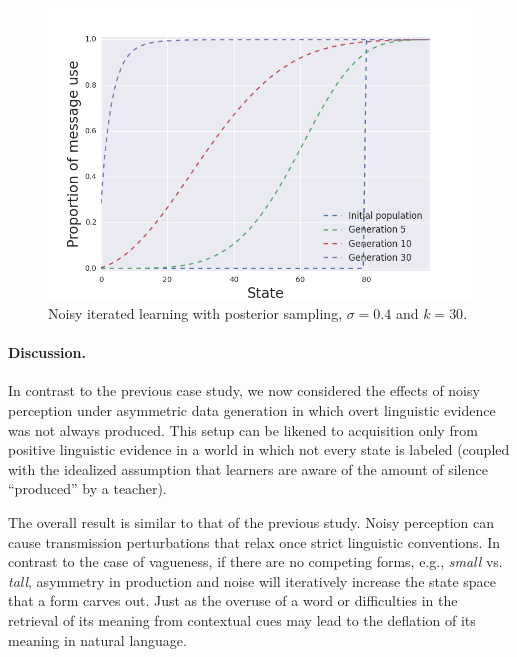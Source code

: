 \documentclass[10pt,a4paper]{article}
\begin{document}
\begin{figure}[ht]
\centering
    \includegraphics[scale=0.4]{../code/plots/deflation-sigma04.png}
  \caption{Noisy iterated learning with posterior sampling, $\sigma = 0.4$ and $k = 30$.}
  \label{fig:defl}
\end{figure}

\paragraph{Discussion.} In contrast to the previous case study, we now considered the effects of noisy perception under asymmetric data generation in which overt linguistic evidence was not always produced. This setup can be likened to acquisition only from positive linguistic evidence in a world in which not every state is labeled (coupled with the idealized assumption that learners are aware of the amount of silence ``produced'' by a teacher). 

The overall result is similar to that of the previous study. Noisy perception can cause transmission perturbations that relax once strict linguistic conventions. In contrast to the case of vagueness, if there are no competing forms, e.g., {\em small} vs. {\em tall}, asymmetry in production and noise will iteratively increase the state space that a form carves out. Just as the overuse of a word or difficulties in the retrieval of its meaning from contextual cues may lead to the deflation of its meaning in natural language.
\end{document}
